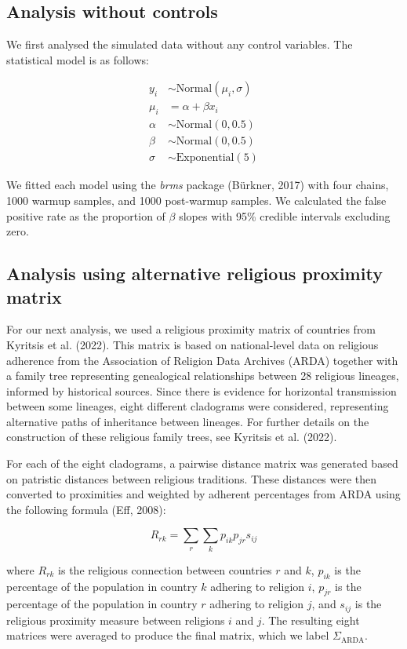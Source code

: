 \subsection*{Analysis without controls}

We first analysed the simulated data without any control variables. The
statistical model is as follows:

\begin{align}
y_i &\sim \text{Normal}(\mu_i, \sigma) \nonumber \\
\mu_i &= \alpha + \beta x_i \nonumber \\
\alpha &\sim \text{Normal}(0, 0.5) \nonumber \\
\beta &\sim \text{Normal}(0, 0.5) \nonumber \\
\sigma &\sim \text{Exponential}(5) \nonumber
\end{align}

We fitted each model using the \textit{brms} package (Bürkner, 2017) with four 
chains, 1000 warmup samples, and 1000 post-warmup samples. We calculated the 
false positive rate as the proportion of $\beta$ slopes with 95\% credible 
intervals excluding zero.

\subsection*{Analysis using alternative religious proximity matrix}

For our next analysis, we used a religious proximity matrix of countries from 
Kyritsis et al. (2022). This matrix is based on national-level data on religious
adherence from the Association of Religion Data Archives (ARDA) together with a
family tree representing genealogical relationships between 28 religious
lineages, informed by historical sources. Since there is evidence for horizontal
transmission between some lineages, eight different cladograms were considered,
representing alternative paths of inheritance between lineages. For further
details on the construction of these religious family trees, see Kyritsis et al.
(2022).

For each of the eight cladograms, a pairwise distance matrix was generated based
on patristic distances between religious traditions. These distances were then 
converted to proximities and weighted by adherent percentages from ARDA 
using the following formula (Eff, 2008):

\[R_{rk} = \sum_{r} \sum_{k} p_{ik} p_{jr} s_{ij}\]

where $R_{rk}$ is the religious connection between countries $r$ and $k$,
$p_{ik}$ is the percentage of the population in country $k$ adhering to religion
$i$, $p_{jr}$ is the percentage of the population in country $r$ adhering to 
religion $j$, and $s_{ij}$ is the religious proximity measure between religions
$i$ and $j$. The resulting eight matrices were averaged to produce the final
matrix, which we label $\Sigma_\text{ARDA}$.

